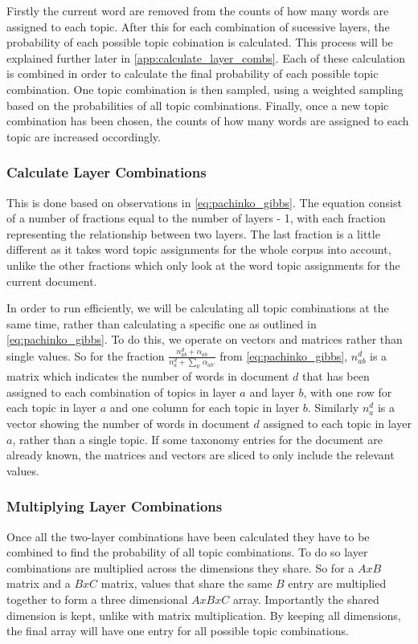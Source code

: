 Firstly the current word are removed from the counts of how many words are assigned to each topic.
After this for each combination of sucessive layers, the probability of each possible topic cobination is calculated.
This process will be explained further later in \autoref{app:calculate_layer_combs}.
Each of these calculation is combined in order to calculate the final probability of each possible topic combination.
One topic combination is then sampled, using a weighted sampling based on the probabilities of all topic combinations.
Finally, once a new topic combination has been chosen, the counts of how many words are assigned to each topic are increased occordingly.

\subsubsection{Calculate Layer Combinations}\label{app:calculate_layer_combs}
This is done based on observations in \autoref{eq:pachinko_gibbs}.
The equation consist of a number of fractions equal to the number of layers - 1, with each fraction representing the relationship between two layers.
The last fraction is a little different as it takes word topic assignments for the whole corpus into account, unlike the other fractions which only look at the word topic assignments for the current document.

In order to run efficiently, we will be calculating all topic combinations at the same time, rather than calculating a specific one as outlined in \autoref{eq:pachinko_gibbs}.
To do this, we operate on vectors and matrices rather than single values.
So for the fraction $\frac{n_{ab}^d + \alpha_{ab}}{n_a^d + \sum_{b'} \alpha_{ab'}}$ from \autoref{eq:pachinko_gibbs}, $n_{ab}^d$ is a matrix which indicates the number of words in document $d$ that has been assigned to each combination of topics in layer $a$ and layer $b$, with one row for each topic in layer $a$ and one column for each topic in layer $b$.
Similarly $n_a^d$ is a vector showing the number of words in document $d$ assigned to each topic in layer $a$, rather than a single topic.
If some taxonomy entries for the document are already known, the matrices and vectors are sliced to only include the relevant values.

\subsubsection{Multiplying Layer Combinations}
Once all the two-layer combinations have been calculated they have to be combined to find the probability of all topic combinations.
To do so layer combinations are multiplied across the dimensions they share.
So for a $AxB$ matrix and a $BxC$ matrix, values that share the same $B$ entry are multiplied together to form a three dimensional $AxBxC$ array.
Importantly the shared dimension is kept, unlike with matrix multiplication.
By keeping all dimensions, the final array will have one entry for all possible topic combinations.


